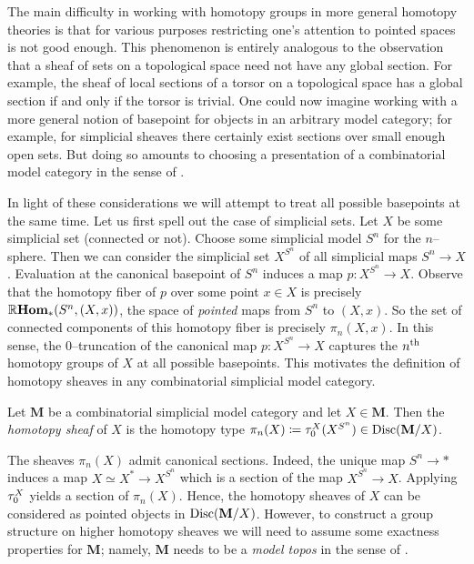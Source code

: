 The main difficulty in working with homotopy groups in more general
homotopy theories is that for various purposes restricting one's
attention to pointed spaces is not good enough. This phenomenon is
entirely analogous to the observation that a sheaf of sets on a
topological space need not have any global section. For example, the
sheaf of local sections of a torsor on a topological space has a
global section if and only if the torsor is trivial. One could now
imagine working with a more general notion of basepoint for objects in
an arbitrary model category; for example, for simplicial sheaves there
certainly exist sections over small enough open sets. But doing so
amounts to choosing a presentation of a combinatorial model category
in the sense of \cite{mr1870516}.

In light of these considerations we will attempt to treat all possible
basepoints at the same time. Let us first spell out the case of
simplicial sets. Let \(X\) be some simplicial set (connected or
not). Choose some simplicial model \(S^{n}\) for the
\(n\)--sphere. Then we can consider the simplicial set \(X^{S^{n}}\)
of all simplicial maps \(S^{n}\to X\). Evaluation at the canonical
basepoint of \(S^{n}\) induces a map \(p\colon X^{S^{n}}\to
X\). Observe that the homotopy fiber of \(p\) over some point \(x\in
X\) is precisely \(\operatorname{\mathbb{R}\textnormal{\bfseries Hom}}_{*}(S^{n}, (X,x))\), the space of
\emph{pointed} maps from \(S^{n}\) to \((X,x)\). So the set of
connected components of this homotopy fiber is precisely
\(\pi_{n}(X,x)\). In this sense, the \(0\)--truncation of the
canonical map \(p\colon X^{S^{n}}\to X\) captures the
\(n\textsuperscript{th}\) homotopy groups of \(X\) at all possible
basepoints. This motivates the definition of homotopy sheaves in any
combinatorial simplicial model category.

\begin{definition}
  Let \(\mathbf M\) be a combinatorial simplicial model category and
  let \(X\in\mathbf M\). Then the \emph{
    homotopy sheaf} of \(X\) is the homotopy type
  \(\pi_{n}(X)\coloneqq\tau_{0}^{X}(X^{S^{n}})\in\operatorname{\textnormal{Disc}}(\mathbf
  M/X)\).
\end{definition}

The sheaves \(\pi_{n}(X)\) admit canonical sections. Indeed, the
unique map \(S^{n}\to *\) induces a map \(X\simeq X^{*}\to X^{S^{n}}\)
which is a section of the map \(X^{S^{n}}\to X\). Applying
\(\tau_{0}^{X}\) yields a section of \(\pi_{n}(X)\). Hence, the
homotopy sheaves of \(X\) can be considered as pointed objects in
\(\operatorname{\textnormal{Disc}}(\mathbf M/X)\). However, to construct a group structure on
higher homotopy sheaves we will need to assume some exactness
properties for \(\mathbf M\); namely, \(\mathbf M\) needs to be a
\emph{model topos} in the sense of \cite{rezkhomotopytoposes}.

